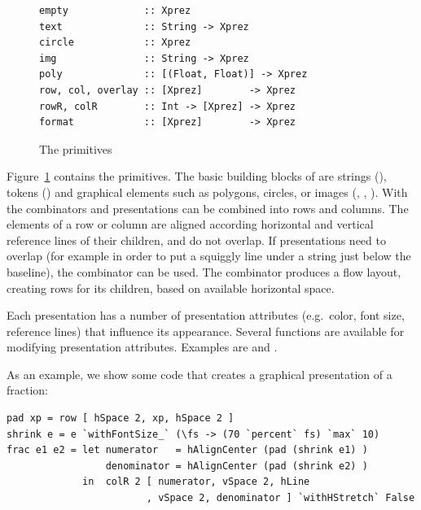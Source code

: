 \documentclass[12pt]{article}
\begin{document}
\begin{figure}
\begin{footnotesize}
\begin{center}
\begin{footnotesize}
\begin{verbatim}
empty             :: Xprez
text              :: String -> Xprez             
circle            :: Xprez                       
img               :: String -> Xprez             
poly              :: [(Float, Float)] -> Xprez 
row, col, overlay :: [Xprez]        -> Xprez          
rowR, colR        :: Int -> [Xprez] -> Xprez   
format            :: [Xprez]        -> Xprez
\end{verbatim}
\end{footnotesize}
\caption{The {\Xprez} primitives} \label{fig:xprezPrim} 
\end{center}
\end{footnotesize}
\end{figure}

Figure~\ref{fig:xprezPrim} contains the \Xprez primitives. The basic building blocks of \Xprez are strings (), tokens () and graphical elements such as polygons, circles, or images (, , ). With the combinators  and  presentations can be combined into rows and columns. The elements of a row or column are aligned according horizontal and vertical reference lines of their children, and do not overlap. If presentations need to overlap (for example in order to put a squiggly line under a string just below the baseline), the  combinator can be used. The  combinator produces a flow layout, creating rows for its children, based on available horizontal space.

Each presentation has a number of presentation attributes (e.g.\ color, font size, reference lines) that influence its appearance. Several functions are available for modifying presentation attributes. Examples are  and . 


As an example, we show some \Xprez code that creates a graphical presentation of a fraction:

\begin{footnotesize}
\begin{verbatim}
pad xp = row [ hSpace 2, xp, hSpace 2 ]
shrink e = e `withFontSize_` (\fs -> (70 `percent` fs) `max` 10)
frac e1 e2 = let numerator   = hAlignCenter (pad (shrink e1) )
                 denominator = hAlignCenter (pad (shrink e2) )
             in  colR 2 [ numerator, vSpace 2, hLine
                        , vSpace 2, denominator ] `withHStretch` False
\end{verbatim}
\end{footnotesize}
\end{document}
